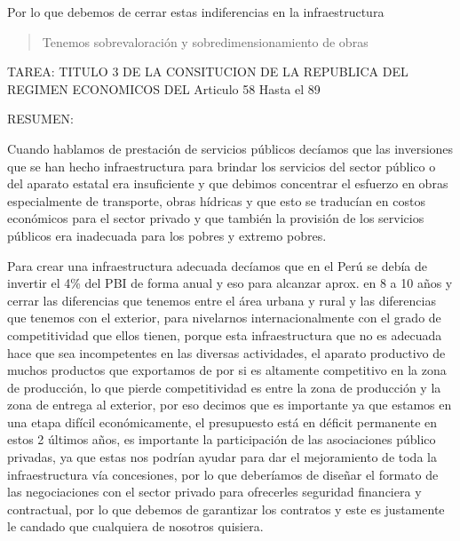 \documentclass[
  a4paper,
]{article}
\begin{document}
Por lo que debemos de cerrar estas indiferencias en la infraestructura

\begin{quote}
Tenemos sobrevaloración y sobredimensionamiento de obras
\end{quote}

TAREA: TITULO 3 DE LA CONSITUCION DE LA REPUBLICA DEL REGIMEN ECONOMICOS
DEL Articulo 58 Hasta el 89

RESUMEN:

Cuando hablamos de prestación de servicios públicos decíamos que las
inversiones que se han hecho infraestructura para brindar los servicios
del sector público o del aparato estatal era insuficiente y que debimos
concentrar el esfuerzo en obras especialmente de transporte, obras
hídricas y que esto se traducían en costos económicos para el sector
privado y que también la provisión de los servicios públicos era
inadecuada para los pobres y extremo pobres.

Para crear una infraestructura adecuada decíamos que en el Perú se debía
de invertir el 4\% del PBI de forma anual y eso para alcanzar aprox. en
8 a 10 años y cerrar las diferencias que tenemos entre el área urbana y
rural y las diferencias que tenemos con el exterior, para nivelarnos
internacionalmente con el grado de competitividad que ellos tienen,
porque esta infraestructura que no es adecuada hace que sea
incompetentes en las diversas actividades, el aparato productivo de
muchos productos que exportamos de por si es altamente competitivo en la
zona de producción, lo que pierde competitividad es entre la zona de
producción y la zona de entrega al exterior, por eso decimos que es
importante ya que estamos en una etapa difícil económicamente, el
presupuesto está en déficit permanente en estos 2 últimos años, es
importante la participación de las asociaciones público privadas, ya que
estas nos podrían ayudar para dar el mejoramiento de toda la
infraestructura vía concesiones, por lo que deberíamos de diseñar el
formato de las negociaciones con el sector privado para ofrecerles
seguridad financiera y contractual, por lo que debemos de garantizar los
contratos y este es justamente le candado que cualquiera de nosotros
quisiera.
\end{document}
